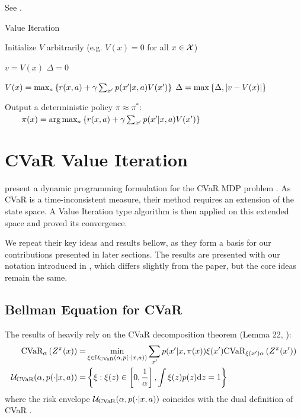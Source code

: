 See .


\begin{algorithm}
\caption{Value Iteration}
\label{alg:vi}
\begin{algorithmic}
    \STATE Initialize $V$ arbitrarily (e.g. $V(x)=0$ for all $x \in \mathcal{X}$)
    
	\REPEAT
	
	\STATE $v = V(x)$
	\STATE $\Delta = 0$
	
	\STATE $V(x) = \max_a\left\{ {r(x, a) + \gamma\sum_{x'}p(x'|x, a)V(x')} \right\}$
	\STATE $\Delta = \max\left\{ {\Delta, |v-V(x)|} \right\}$
	\ENDFOR
	
	\UNTIL{ $\Delta < \epsilon$ }
	
	\STATE Output a deterministic policy $\pi \approx \pi^*$:
   	\STATE $\quad\quad \pi(x) = \text{arg}\max_a\left\{ {r(x, a) + \gamma\sum_{x'}p(x'|x, a)V(x')} \right\}$
\end{algorithmic}
\end{algorithm}


\section{CVaR Value Iteration}\label{sec:vi:cvar}

\citet{chow2015risk} present a dynamic programming formulation for the CVaR MDP problem . As CVaR is a time-inconsistent measure, their method requires an extension of the state space. A Value Iteration type algorithm is then applied on this extended space and \citet{chow2015risk} proved its convergence. 

We repeat their key ideas and results bellow, as they form a basis for our contributions presented in later sections. The results are presented with our notation introduced in , which differs slightly from the paper, but the core ideas remain the same.

\subsection{Bellman Equation for CVaR}

The results of \citet{chow2015risk} heavily rely on the CVaR decomposition theorem (Lemma 22, \citep{pflug2016time}):
%
\begin{equation}\label{eqn:cvardecomp}
\begin{split}
\text{CVaR}_\alpha\left( {Z^\pi(x)} \right) =& \min_{\xi \in \mathcal{U}_{\text{CVaR}}(\alpha, p(\cdot | x, a))} \sum_{x'} p(x'| x, \pi(x))\xi(x') \text{CVaR}_{\xi(x')\alpha}\left( {Z^\pi(x')} \right)\\
\mathcal{U}_{\text{CVaR}}(\alpha, p(\cdot | x, a)) =& \left\{ {\xi : \xi(z) \in \left[ {0, \frac{1}{\alpha}} \right], \int \xi(z)p(z) \text{d}z = 1} \right\}
\end{split}
\end{equation}
%
where the risk envelope $\mathcal{U}_{\text{CVaR}}(\alpha, p(\cdot | x, a))$ coincides with the dual definition of CVaR .

